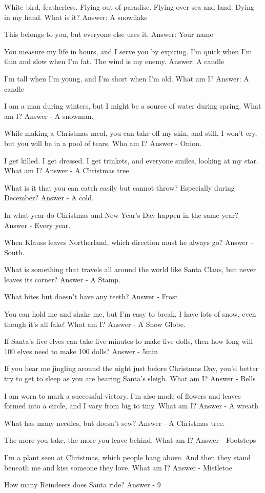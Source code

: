 \documentclass{article}
\begin{document}
\begin{multicols*}{2}
	White bird, featherless. Flying out of paradise. Flying over sea and land. Dying in my hand. What is it?
	Answer: A snowflake
	
	This belongs to you, but everyone else uses it.
	Answer: Your name
	
	You measure my life in hours, and I serve you by expiring. I'm quick when I'm thin and slow when I'm fat. The wind is my enemy.
	Answer: A candle
	
	I’m tall when I’m young, and I’m short when I’m old. What am I?
	Answer: A candle
	
	I am a man during winters, but I might be a source of water during spring. What am I?
	Answer - A snowman.
	
	While making a Christmas meal, you can take off my skin, and still, I won't cry, but you will be in a pool of tears. Who am I?
	Answer - Onion.
	
	I get killed. I get dressed. I get trinkets, and everyone smiles, looking at my star. What am I?
	Answer - A Christmas tree.
	
	What is it that you can catch easily but cannot throw? Especially during December?
	Answer - A cold.
	
	In what year do Christmas and New Year’s Day happen in the same year?
	Answer - Every year.
	
	When Klauss leaves Northerland, which direction must he always go?
	Answer - South.
	
	What is something that travels all around the world like Santa Claus, but never leaves its corner?
	Answer - A Stamp.
	
	What bites but doesn’t have any teeth?
	Answer - Frost
	
	You can hold me and shake me, but I’m easy to break. I have lots of snow, even though it’s all fake! What am I?
	Answer - A Snow Globe.
	
	If Santa’s five elves can take five minutes to make five dolls, then how long will 100 elves need to make 100 dolls?
	Answer - 5min
	
	If you hear me jingling around the night just before Christmas Day, you’d better try to get to sleep as you are hearing Santa’s sleigh. What am I?
	Answer - Bells
	
	I am worn to mark a successful victory. I’m also made of flowers and leaves formed into a circle, and I vary from big to tiny. What am I?
	Answer - A wreath
	
	What has many needles, but doesn’t sew?
	Answer - A Christmas tree.
	
	 The more you take, the more you leave behind. What am I?
	 Answer - Footsteps
	
	I’m a plant seen at Christmas, which people hang above. And then they stand beneath me and kiss someone they love. What am I?
	Answer - Mistletoe
	
	How many Reindeers does Santa ride?
	Answer - 9
	
	\pagebreak
	
	
\end{multicols*}
	
\end{document}
